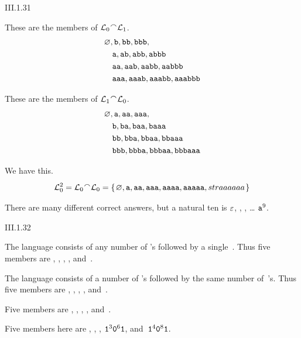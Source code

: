 %
\begin{ans}{III.1.31}
\begin{exparts}
\item These are the members of $\lang_0\concat\lang_1$.
\begin{align*}
  &\varnothing,\texttt{b},\texttt{bb},\texttt{bbb},  \\
  &\quad \texttt{a},\texttt{ab},\texttt{abb},\texttt{abbb} \\
  &\quad \texttt{aa},\texttt{aab},\texttt{aabb},\texttt{aabbb} \\
  &\quad \texttt{aaa},\texttt{aaab},\texttt{aaabb},\texttt{aaabbb}
\end{align*}
\item These are the members of $\lang_1\concat\lang_0$.
\begin{align*}
  &\varnothing,\texttt{a},\texttt{aa},\texttt{aaa},  \\
  &\quad \texttt{b},\texttt{ba},\texttt{baa},\texttt{baaa} \\
  &\quad \texttt{bb},\texttt{bba},\texttt{bbaa},\texttt{bbaaa} \\
  &\quad \texttt{bbb},\texttt{bbba},\texttt{bbbaa},\texttt{bbbaaa}
\end{align*}
\item We have this.
\begin{equation*}
  \lang_0^2=\lang_0\concat\lang_0=
    \set{\emptyset,\str{a},\str{aa},\str{aaa},\str{aaaa},\str{aaaaa},str{aaaaaa}}
\end{equation*}
\item There are many different correct answers, but
  a natural ten is $\varepsilon$, , , \ldots{} $\texttt{a}^9$.
\end{exparts}
\end{ans}
%
\begin{ans}{III.1.32}
\begin{exparts}
\item The language consists of any number of 's followed by a
  single~.
  Thus five members are , , , ,
  and~.
\item The language consists of a number of 's followed by the same
  number of~'s.
  Thus five members are \emptystring, , , ,
  and~.
\item Five members are
  , , , , and~.
\item Five members here are
  , , , $\texttt{1}^3\texttt{0}^6\texttt{1}$,
  and~$\texttt{1}^4\texttt{0}^8\texttt{1}$.
\end{exparts}
\end{ans}
